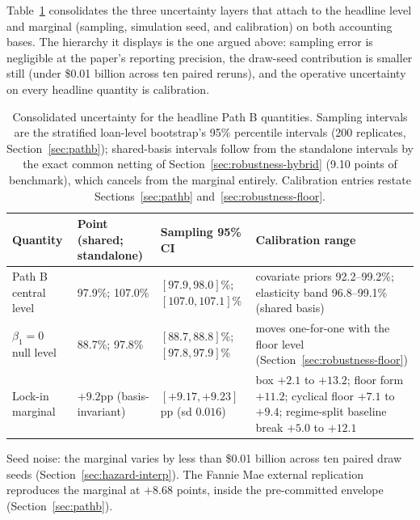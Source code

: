 \documentclass[12pt]{article}
\begin{document}
Table~\ref{tab:uncertainty} consolidates the three uncertainty layers that attach to the headline level and marginal (sampling, simulation seed, and calibration) on both accounting bases. The hierarchy it displays is the one argued above: sampling error is negligible at the paper's reporting precision, the draw-seed contribution is smaller still (under \$0.01 billion across ten paired reruns), and the operative uncertainty on every headline quantity is calibration.

\begin{table}[H]
\centering
\caption{Consolidated uncertainty for the headline Path B quantities. Sampling intervals are the stratified loan-level bootstrap's 95\% percentile intervals (200 replicates, Section~\ref{sec:pathb}); shared-basis intervals follow from the standalone intervals by the exact common netting of Section~\ref{sec:robustness-hybrid} (9.10 points of benchmark), which cancels from the marginal entirely. Calibration entries restate Sections~\ref{sec:pathb} and~\ref{sec:robustness-floor}.}
\label{tab:uncertainty}
\footnotesize
\begin{threeparttable}
\begin{tabular}{@{}p{2.4cm}p{3.3cm}p{4.0cm}p{4.8cm}@{}}
\toprule
Quantity & Point (shared; standalone) & Sampling 95\% CI & Calibration range \\
\midrule
Path B central level & 97.9\%; 107.0\% & $[97.9, 98.0]$\%; $[107.0, 107.1]$\% & covariate priors 92.2--99.2\%; elasticity band 96.8--99.1\% (shared basis) \\
$\beta_1 = 0$ null level & 88.7\%; 97.8\% & $[88.7, 88.8]$\%; $[97.8, 97.9]$\% & moves one-for-one with the floor level (Section~\ref{sec:robustness-floor}) \\
Lock-in marginal & $+9.2$pp (basis-invariant) & $[+9.17, +9.23]$pp (sd $0.016$) & box $+2.1$ to $+13.2$; floor form $+11.2$; cyclical floor $+7.1$ to $+9.4$; regime-split baseline break $+5.0$ to $+12.1$ \\
\bottomrule
\end{tabular}
\begin{tablenotes}[flushleft]\footnotesize
\item Seed noise: the marginal varies by less than \$0.01 billion across ten paired draw seeds (Section~\ref{sec:hazard-interp}). The Fannie Mae external replication reproduces the marginal at $+8.68$ points, inside the pre-committed envelope (Section~\ref{sec:pathb}).
\end{tablenotes}
\end{threeparttable}
\end{table}
\end{document}

